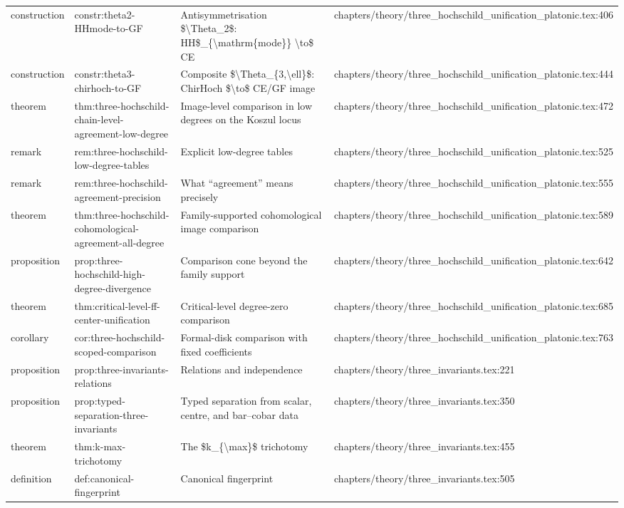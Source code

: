 \documentclass[11pt]{article}
\begin{document}
\begin{longtable}{L{0.10\textwidth}L{0.26\textwidth}L{0.42\textwidth}L{0.22\textwidth}}
construction & constr:theta2-HHmode-to-GF & Antisymmetrisation \$\textbackslash{}Theta\_2\$: HH\$\_\{\textbackslash{}mathrm\{mode\}\} \textbackslash{}to\$ CE & chapters/theory/three\_hochschild\_unification\_platonic.tex:406\\
construction & constr:theta3-chirhoch-to-GF & Composite \$\textbackslash{}Theta\_\{3,\textbackslash{}ell\}\$: ChirHoch \$\textbackslash{}to\$ CE/GF image & chapters/theory/three\_hochschild\_unification\_platonic.tex:444\\
theorem & thm:three-hochschild-chain-level-agreement-low-degree & Image-level comparison in low degrees on the Koszul locus & chapters/theory/three\_hochschild\_unification\_platonic.tex:472\\
remark & rem:three-hochschild-low-degree-tables & Explicit low-degree tables & chapters/theory/three\_hochschild\_unification\_platonic.tex:525\\
remark & rem:three-hochschild-agreement-precision & What ``agreement'' means precisely & chapters/theory/three\_hochschild\_unification\_platonic.tex:555\\
theorem & thm:three-hochschild-cohomological-agreement-all-degree & Family-supported cohomological image comparison & chapters/theory/three\_hochschild\_unification\_platonic.tex:589\\
proposition & prop:three-hochschild-high-degree-divergence & Comparison cone beyond the family support & chapters/theory/three\_hochschild\_unification\_platonic.tex:642\\
theorem & thm:critical-level-ff-center-unification & Critical-level degree-zero comparison & chapters/theory/three\_hochschild\_unification\_platonic.tex:685\\
corollary & cor:three-hochschild-scoped-comparison & Formal-disk comparison with fixed coefficients & chapters/theory/three\_hochschild\_unification\_platonic.tex:763\\
proposition & prop:three-invariants-relations & Relations and independence & chapters/theory/three\_invariants.tex:221\\
proposition & prop:typed-separation-three-invariants & Typed separation from scalar, centre, and bar--cobar data & chapters/theory/three\_invariants.tex:350\\
theorem & thm:k-max-trichotomy & The \$k\_\{\textbackslash{}max\}\$ trichotomy & chapters/theory/three\_invariants.tex:455\\
definition & def:canonical-fingerprint & Canonical fingerprint & chapters/theory/three\_invariants.tex:505\\

\end{longtable}
\end{document}
